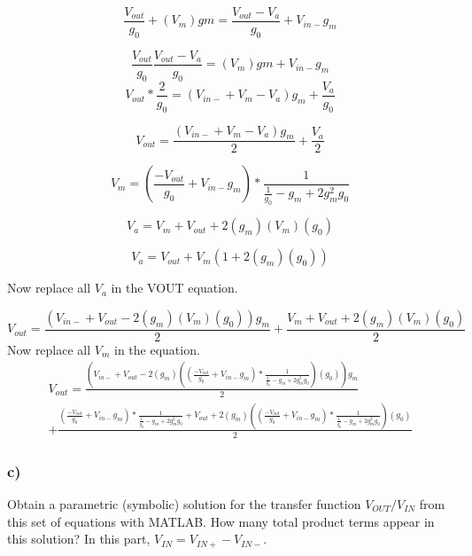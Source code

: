 \documentclass[10pt,a4paper]{article}
\begin{document}
\begin{equation}
\frac{V_{out}}{g_0} + (V_m) gm = \frac{V_{out} - V_a }{g_0} + V_{in-}g_m 
\end{equation}

\begin{equation}
\frac{V_{out}}{g_0} \frac{V_{out} - V_a }{g_0} = (V_m) gm + V_{in-}g_m 
\end{equation}
\begin{equation}
V_{out} * \frac{2}{g_0} = (V_{in-} + V_m - V_a)g_m +  \frac{V_{a}}{g_0}
\end{equation}

\begin{equation}
V_{out} = \frac{(V_{in-} + V_m - V_a)g_m}{2} +  \frac{V_{a}}{2}
\end{equation}



\begin{equation}
V_{m} = (\frac{-V_{out}}{g_0} + V_{in-}g_m) * \frac{1}{\frac{1}{g_0} - g_m + 2g_m^2g_0}
\end{equation}

\begin{equation}
V_{a} = V_m + V_{out} + 2(g_m)(V_m)(g_0)
\end{equation}

\begin{equation}
V_{a} = V_{out} + V_m( 1+ 2(g_m)(g_0))
\end{equation}


Now replace all $V_a$ in the VOUT equation.

\begin{equation}
V_{out} = \frac{(V_{in-} + V_{out} - 2(g_m)(V_m)(g_0))g_m}{2} +  \frac{V_m + V_{out} + 2(g_m)(V_m)(g_0)}{2}
\end{equation}
Now replace all $V_m$ in the  equation.
\begin{multline}
V_{out} = \frac{(V_{in-} + V_{out} - 2(g_m)((\frac{-V_{out}}{g_0} + V_{in-}g_m) * \frac{1}{\frac{1}{g_0} - g_m + 2g_m^2g_0})(g_0))g_m}{2}\\ +  \frac{(\frac{-V_{out}}{g_0} + V_{in-}g_m) * \frac{1}{\frac{1}{g_0} - g_m + 2g_m^2g_0} + V_{out} + 2(g_m)((\frac{-V_{out}}{g_0} + V_{in-}g_m) * \frac{1}{\frac{1}{g_0} - g_m + 2g_m^2g_0})(g_0)}{2}
\end{multline}




\subsubsection*{c)}
Obtain a parametric (symbolic) solution for the transfer function \(V_{OUT}/V_{IN}\)
from this set of equations with MATLAB. How many total product terms appear in this
solution? In this part, \(V_{IN} = V_{IN+} - V_{IN-}\).
\end{document}
